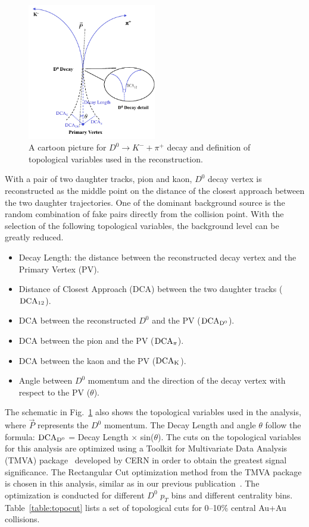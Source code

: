 \documentclass[%
 reprint,	
 amsmath,amssymb,
 aps,
 prc,
]{revtex4-1}
\begin{document}
\begin{figure}
\centering
\includegraphics[width=0.50\textwidth]{fig/D0carton.pdf}
\caption{A cartoon picture for $D^0\rightarrow K^-+\pi^+$ decay and definition of topological variables used in the reconstruction.}
\label{fig:D0carton} 
\end{figure}

With a pair of two daughter tracks, pion and kaon, $D^0$ decay vertex is reconstructed as the middle point on the distance of the closest approach between the two daughter trajectories. One of the dominant background source is the random combination of fake pairs directly from the collision point. With the selection of the following topological variables, the background level can be greatly reduced.

\begin{itemize}
  \item Decay Length: the distance between the reconstructed decay vertex and the Primary Vertex (PV).
  \item Distance of Closest Approach (DCA) between the two daughter tracks ($\rm{DCA_{12}}$).
  \item DCA between the reconstructed $D^0$ and the PV ($\rm{DCA_{D^{0}}}$).
  \item DCA between the pion and the PV ($\rm{DCA_{\pi}}$).
  \item DCA between the kaon and the PV ($\rm{DCA_{K}}$).
  \item Angle between $D^0$ momentum and the direction of the decay vertex with respect to the PV ($\theta$).
\end{itemize}

The schematic in Fig.~\ref{fig:D0carton} also shows the topological variables used in the analysis, where $\vec{P}$ represents the $D^0$ momentum. The Decay Length and angle $\theta$ follow the formula: $\rm DCA_{D^{0}}$ = Decay Length $\times$ sin($\theta$). The cuts on the topological variables for this analysis are optimized using a Toolkit for Multivariate Data Analysis (TMVA) package~\cite{TMVA} developed by CERN in order to obtain the greatest signal significance. The Rectangular Cut optimization method from the TMVA package is chosen in this analysis, similar as in our previous publication~\cite{Star_D_v2}. The optimization is conducted for different $D^0$ $p_{T}$ bins and different centrality bins. Table~\ref{table:topocut} lists a set of topological cuts for 0--10\% central Au+Au collisions.
\end{document}
